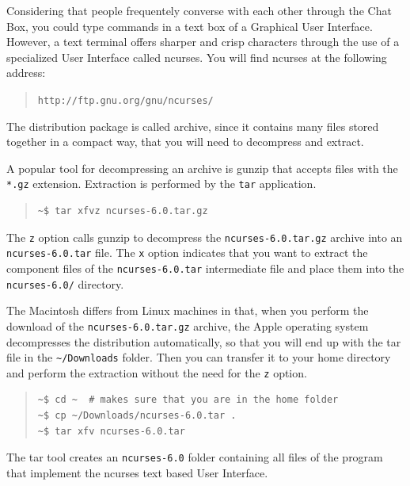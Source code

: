 \documentclass[a4paper,12pt]{book}
\begin{document}
Considering that people frequentely
converse with each other through
the Chat Box, you could type commands
in a text box of a Graphical User
Interface. However, a text terminal
offers sharper and crisp characters
through the use of a specialized
User Interface called ncurses.
You will find ncurses at
the following address:
\begin{quote}
\verb|http://ftp.gnu.org/gnu/ncurses/|
\end{quote}
The distribution package is called
archive, since it contains many
files stored together in a compact way,
that you will need to decompress
and extract.

A popular tool for decompressing an archive
is gunzip that accepts files with the \verb|*.gz|
extension. Extraction is performed by the \verb|tar|
application. 
\begin{quote}
\begin{verbatim}
~$ tar xfvz ncurses-6.0.tar.gz
\end{verbatim}
\end{quote}
The \verb|z| option calls gunzip to
decompress the
\verb|ncurses-6.0.tar.gz| archive into
an \verb|ncurses-6.0.tar| file. The
\verb|x| option indicates that
you want to extract the component
files of the \verb|ncurses-6.0.tar| intermediate
file and place them into the \verb|ncurses-6.0/|
directory.

The Macintosh differs from Linux machines
in that, when you perform the download of the
\verb|ncurses-6.0.tar.gz| archive, the
Apple operating system decompresses the distribution
automatically, so that you will end up
with the tar file in the \verb|~/Downloads|
folder. Then you can transfer it to your home directory
and perform the extraction without the need for the
\verb|z| option.
\begin{quote}
\begin{verbatim}
~$ cd ~  # makes sure that you are in the home folder
~$ cp ~/Downloads/ncurses-6.0.tar .
~$ tar xfv ncurses-6.0.tar
\end{verbatim}
\end{quote}

The tar tool creates an \verb|ncurses-6.0| folder
containing all files of the program that implement
the ncurses text based User Interface.
\end{document}
